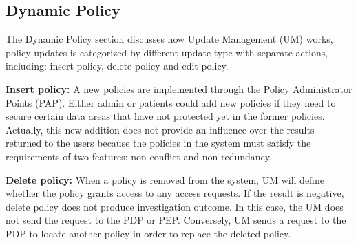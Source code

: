 \documentclass[conference]{IEEEtran}
\begin{document}
\subsection{Dynamic Policy}\label{App:DyPol}
The Dynamic Policy section discusses how Update Management (UM) works, policy updates is categorized by different update type with separate actions, including: insert policy, delete policy and edit policy.

\textbf{Insert policy:}
A new policies are implemented through the Policy Administrator Points (PAP). 
Either admin or patients could add new policies if they need to secure certain data areas that have not protected yet in the former policies. 
Actually, this new addition does not provide an influence over the results returned to the users because the policies in the system must satisfy the requirements of two features: non-conflict and non-redundancy.

\textbf{Delete policy:}
When a policy is removed from the system, UM will define whether the policy grants access to any access requests. 
If the result is negative, delete policy does not produce investigation outcome.
In this case, the UM does not send the request to the PDP or PEP.
Conversely, UM sends a request to the PDP to locate another policy in order to replace the deleted policy.
\end{document}
